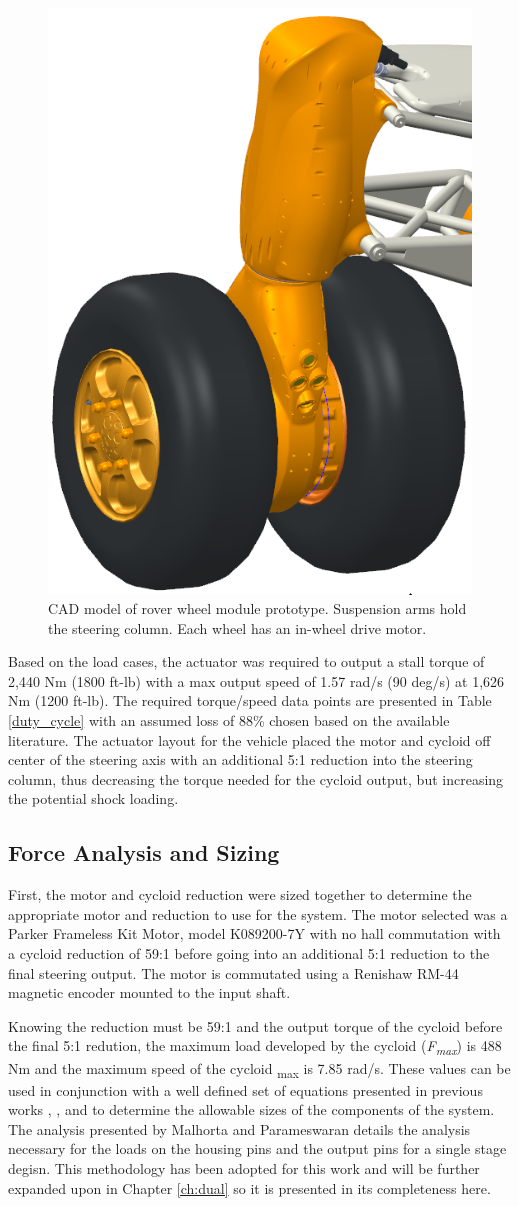 \begin{figure}[t]
   \centering
   \includegraphics[width=0.40\linewidth]{fig/wheel_module_CAD}
   \caption{CAD model of rover wheel module prototype.
   Suspension arms hold the steering column.
   Each wheel has an in-wheel drive motor.}
   \label{fig:wheel_module}
\end{figure}

Based on the load cases, the actuator was required to output a stall torque of 2,440 Nm (1800 ft-lb) with a max output speed of 1.57 rad/s (90 deg/s) at 1,626 Nm (1200 ft-lb).
The required torque/speed data points are presented in Table \ref{duty_cycle} with an assumed loss of 88\% chosen based on the available literature.
The actuator layout for the vehicle placed the motor and cycloid off center of the steering axis with an additional 5:1 reduction into the steering column, thus decreasing the torque needed for the cycloid output, but increasing the potential shock loading.

\subsection{Force Analysis and Sizing} \label{ch:design:single:force_analysis}

First, the motor and cycloid reduction were sized together to determine the appropriate motor and reduction to use for the system. The motor selected was a Parker Frameless Kit Motor, model K089200-7Y with no hall commutation with a cycloid reduction of 59:1 before going into an additional 5:1 reduction to the final steering output. The motor is commutated using a Renishaw RM-44 magnetic encoder mounted to the input shaft. 

Knowing the reduction must be 59:1 and the output torque of the cycloid before the final 5:1 redution, the maximum load developed by the cycloid (\textit{F\textsubscript{max}}) is 488 Nm and the maximum speed of the cycloid {\textomega\textsubscript{max}} is 7.85 rad/s. These values can be used in conjunction with a well defined set of equations presented in previous works \cite{ref:malhorta}, \cite{ref:li}, and \cite{ref:unified_approach} to determine the allowable sizes of the components of the system. The analysis presented by Malhorta and Parameswaran details the analysis necessary for the loads on the housing pins and the output pins for a single stage degisn. This methodology has been adopted for this work and will be further expanded upon in Chapter \ref{ch:dual} so it is presented in its completeness here. 

